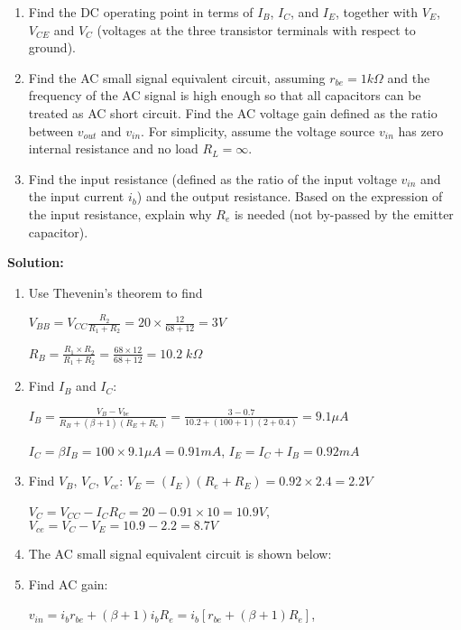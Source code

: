 \begin{enumerate}

\begin{enumerate}
\item Find the DC operating point in terms of $I_B$, $I_C$, and $I_E$, 
  together with $V_E$, $V_{CE}$ and $V_C$ (voltages at the three transistor 
  terminals with respect to ground). 
\item Find the AC small signal equivalent circuit, assuming $r_{be}=1k\Omega$
  and the frequency of the AC signal is high enough so that all capacitors 
  can be treated as AC short circuit. Find the AC voltage gain defined as the 
  ratio between $v_{out}$ and $v_{in}$. For simplicity, assume the voltage
  source $v_{in}$ has zero internal resistance and no load $R_L=\infty$.
\item Find the input resistance (defined as the ratio of the input voltage
  $v_{in}$ and the input current $i_b$) and the output resistance. Based on
  the expression of the input resistance, explain why $R_e$ is needed (not
  by-passed by the emitter capacitor).
\end{enumerate}

 {\bf Solution:}
 \begin{enumerate}
 \item Use Thevenin's theorem to find 
 
   $V_{BB}=V_{CC}\frac{R_2}{R_1+R_2}=20\times \frac{12}{68+12}=3V$
 
   $R_B=\frac{R_1\times R_2}{R_1+R_2}=\frac{68\times 12}{68+12}=10.2\;k\Omega$
 \item Find $I_B$ and $I_C$:
 
   $I_B=\frac{V_B-V_{be}}{R_B+(\beta+1)(R_E+R_e)}
   =\frac{3-0.7}{10.2+(100+1)(2+0.4)}=9.1\mu A$
 
   $I_C=\beta I_B=100\times 9.1\mu A=0.91 mA$, $I_E=I_C+I_B=0.92 mA$
 
 \item Find $V_B$, $V_C$, $V_{ce}$:
   $V_E=(I_E)(R_e+R_E)=0.92 \times 2.4=2.2V $
 
   $V_C=V_{CC}-I_CR_C=20-0.91\times 10=10.9V$, $V_{ce}=V_C-V_E=10.9-2.2=8.7V$
 
 \item The AC small signal equivalent circuit is shown below:
 
 \item Find AC gain:
   
   $ v_{in}=i_b r_{be}+(\beta+1) i_b R_e=i_b[r_{be}+(\beta+1)R_e]$, 
 

\end{enumerate}
\end{enumerate}
